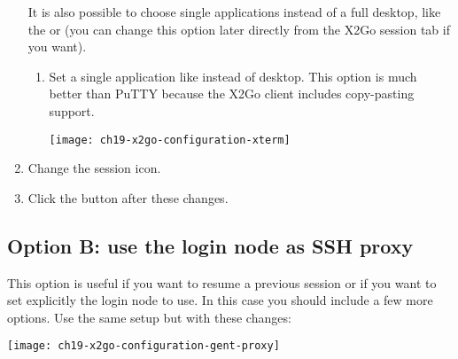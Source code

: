 \begin{enumerate}
    It is also possible to choose single applications instead of a full desktop, like the 
    or  (you can change this option later directly from the X2Go session tab if you want).
    \begin{enumerate}
      \item \strong{[optional]:} Set a single application like  instead of  desktop.
      \ifwindows This option is much better than PuTTY because the X2Go client includes copy-pasting support.\fi
      \begin{center}
        \texttt{[image: ch19-x2go-configuration-xterm]}
      \end{center}
    \end{enumerate}
    \item  \strong{[optional]:} Change the session icon.
    \item  Click the  button after these changes.
\end{enumerate}

\subsection{Option B: use the login node as SSH proxy}
\label{subsec:sessions-x2go-optionb}
This option is useful if you want to resume a previous session or if you want to set explicitly the login node to use.
In this case you should include a few more options. Use the same  setup but with these changes:

\begin{center}
\texttt{[image: ch19-x2go-configuration-gent-proxy]}
\end{center}

